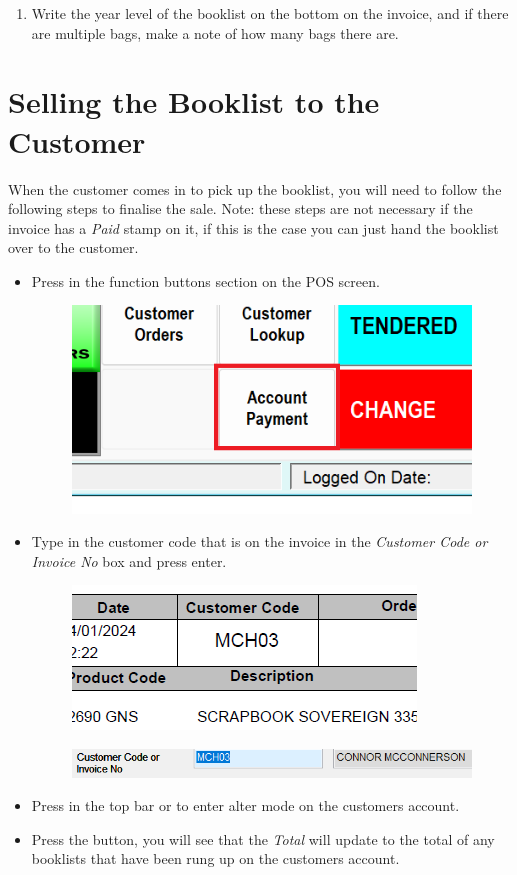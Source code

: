 \documentclass[a4paper, 12pt]{article}
\begin{document}
\begin{enumerate}
    \item Write the year level of the booklist on the bottom on the invoice, and if there are multiple bags, make a note of how many bags there are.
\end{enumerate}

\clearpage
\newpage
\section{Selling the Booklist to the Customer}
When the customer comes in to pick up the booklist, you will need to follow the following steps to finalise the sale. Note: these steps are not necessary if the invoice has a \textit{Paid} stamp on it, if this is the case you can just hand the booklist over to the customer.

\begin{itemize}
    \item Press  in the function buttons section on the POS screen.
    \begin{figure}[h]
        \centering
        \includegraphics[width=0.3\linewidth]{images/accountpayment.png}
    \end{figure}
    \item Type in the customer code that is on the invoice in the \textit{Customer Code or Invoice No} box and press enter.
    \begin{figure}[h]
        \centering
        \includegraphics[width=0.3\linewidth]{images/invoicecustomercode.png}
    \end{figure}
    \begin{figure}[h]
        \centering
        \includegraphics[width=0.7\linewidth]{images/accountcode.png}
    \end{figure}
    \item Press  in the top bar or  to enter alter mode on the customers account.
    \item Press the  button, you will see that the \textit{Total} will update to the total of any booklists that have been rung up on the customers account.

\end{itemize}
\end{document}
